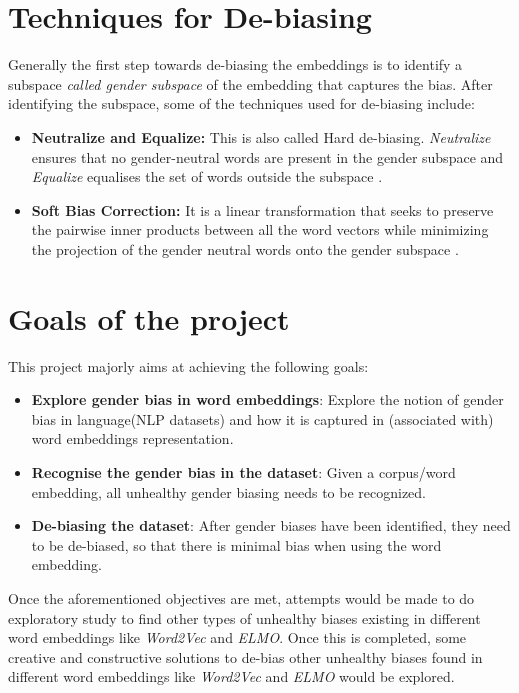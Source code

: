 \documentclass[12pt, a4paper]{article}
\begin{document}
	\section{Techniques for De-biasing}
		Generally the first step towards de-biasing the embeddings is to identify a subspace \emph{called gender subspace} of the embedding that captures the bias\cite{1}. After identifying the subspace, some of the techniques used for de-biasing include:
		\begin{itemize}
			\item \textbf{Neutralize and Equalize:} This is also called Hard de-biasing. \emph{Neutralize} ensures that no gender-neutral words are present in the gender subspace and \emph{Equalize} equalises the set of words outside the subspace \cite{1}.
			\item \textbf{Soft Bias Correction:} It is a linear transformation that seeks to preserve the pairwise inner products between all the word vectors while minimizing the projection of the gender neutral words onto the gender subspace \cite{1}.
		\end{itemize}
		
	
	\section{Goals of the project}
		This project majorly aims at achieving the following goals:
		\begin{itemize}
			\item \textbf{Explore gender bias in word embeddings}: Explore the notion of gender bias in language(NLP datasets) and how it is captured in (associated with) word embeddings representation.
			\item \textbf{Recognise the gender bias in the dataset}: Given a corpus/word embedding, all unhealthy gender biasing needs to be recognized.
			\item \textbf{De-biasing the dataset}: After gender biases have been identified, they need to be de-biased, so that there is minimal bias when using the word embedding.
		\end{itemize}
			Once the aforementioned objectives are met, attempts would be made to do exploratory study to find other types of unhealthy biases existing in different word embeddings like \emph{Word2Vec} and \emph{ELMO}. Once this is completed, some creative and constructive solutions to de-bias other unhealthy biases found in different word embeddings like \emph{Word2Vec} and \emph{ELMO} would be explored.
				
\end{document}
